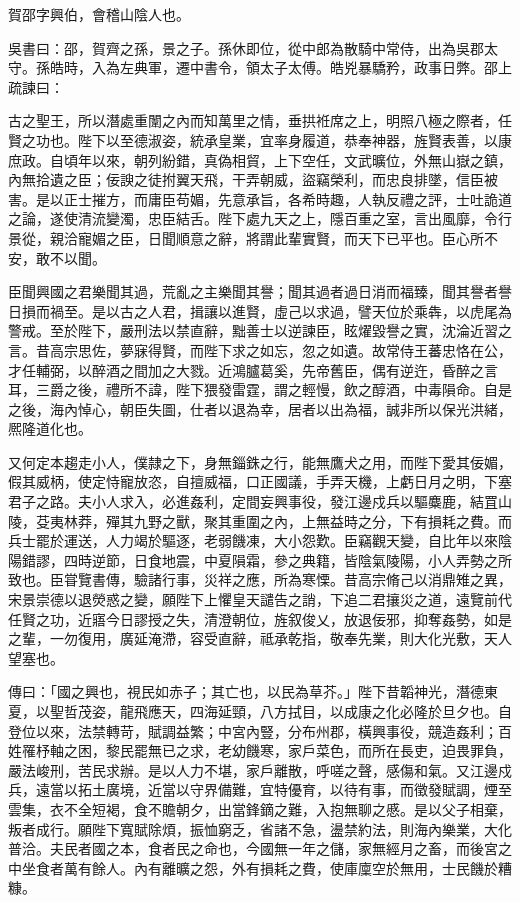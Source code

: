 
\begin{pinyinscope}
賀邵字興伯，會稽山陰人也。

吳書曰：邵，賀齊之孫，景之子。孫休即位，從中郎為散騎中常侍，出為吳郡太守。孫皓時，入為左典軍，遷中書令，領太子太傅。皓兇暴驕矜，政事日弊。邵上疏諫曰：

古之聖王，所以潛處重闈之內而知萬里之情，垂拱袵席之上，明照八極之際者，任賢之功也。陛下以至德淑姿，統承皇業，宜率身履道，恭奉神器，旌賢表善，以康庶政。自頃年以來，朝列紛錯，真偽相貿，上下空任，文武曠位，外無山嶽之鎮，內無拾遺之臣；佞諛之徒拊翼天飛，干弄朝威，盜竊榮利，而忠良排墜，信臣被害。是以正士摧方，而庸臣苟媚，先意承旨，各希時趣，人執反禮之評，士吐詭道之論，遂使清流變濁，忠臣結舌。陛下處九天之上，隱百重之室，言出風靡，令行景從，親洽寵媚之臣，日聞順意之辭，將謂此輩實賢，而天下已平也。臣心所不安，敢不以聞。

臣聞興國之君樂聞其過，荒亂之主樂聞其譽；聞其過者過日消而福臻，聞其譽者譽日損而禍至。是以古之人君，揖讓以進賢，虛己以求過，譬天位於乘犇，以虎尾為警戒。至於陛下，嚴刑法以禁直辭，黜善士以逆諫臣，眩燿毀譽之實，沈淪近習之言。昔高宗思佐，夢寐得賢，而陛下求之如忘，忽之如遺。故常侍王蕃忠恪在公，才任輔弼，以醉酒之間加之大戮。近鴻臚葛奚，先帝舊臣，偶有逆迕，昏醉之言耳，三爵之後，禮所不諱，陛下猥發雷霆，謂之輕慢，飲之醇酒，中毒隕命。自是之後，海內悼心，朝臣失圖，仕者以退為幸，居者以出為福，誠非所以保光洪緒，熈隆道化也。

又何定本趨走小人，僕隷之下，身無錙銖之行，能無鷹犬之用，而陛下愛其佞媚，假其威柄，使定恃寵放恣，自擅威福，口正國議，手弄天機，上虧日月之明，下塞君子之路。夫小人求入，必進姦利，定間妄興事役，發江邊戍兵以驅麋鹿，結罝山陵，芟夷林莽，殫其九野之獸，聚其重圍之內，上無益時之分，下有損耗之費。而兵士罷於運送，人力竭於驅逐，老弱饑凍，大小怨歎。臣竊觀天變，自比年以來陰陽錯謬，四時逆節，日食地震，中夏隕霜，參之典籍，皆陰氣陵陽，小人弄勢之所致也。臣甞覽書傳，驗諸行事，災祥之應，所為寒慄。昔高宗脩己以消鼎雉之異，宋景崇德以退熒惑之變，願陛下上懼皇天譴告之誚，下追二君攘災之道，遠覽前代任賢之功，近寤今日謬授之失，清澄朝位，旌叙俊乂，放退佞邪，抑奪姦勢，如是之輩，一勿復用，廣延淹滯，容受直辭，祗承乾指，敬奉先業，則大化光敷，天人望塞也。

傳曰：「國之興也，視民如赤子；其亡也，以民為草芥。」陛下昔韜神光，潛德東夏，以聖哲茂姿，龍飛應天，四海延頸，八方拭目，以成康之化必隆於旦夕也。自登位以來，法禁轉苛，賦調益繁；中宮內豎，分布州郡，橫興事役，競造姦利；百姓罹杼軸之困，黎民罷無已之求，老幼饑寒，家戶菜色，而所在長吏，迫畏罪負，嚴法峻刑，苦民求辦。是以人力不堪，家戶離散，呼嗟之聲，感傷和氣。又江邊戍兵，遠當以拓土廣境，近當以守界備難，宜特優育，以待有事，而徵發賦調，煙至雲集，衣不全短褐，食不贍朝夕，出當鋒鏑之難，入抱無聊之慼。是以父子相棄，叛者成行。願陛下寬賦除煩，振恤窮乏，省諸不急，盪禁約法，則海內樂業，大化普洽。夫民者國之本，食者民之命也，今國無一年之儲，家無經月之畜，而後宮之中坐食者萬有餘人。內有離曠之怨，外有損耗之費，使庫廩空於無用，士民饑於糟糠。


\end{pinyinscope}
